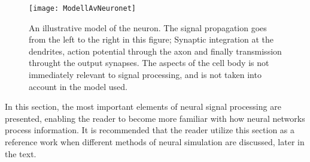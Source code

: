 \begin{figure}[hbt!p]
	\centering
	\texttt{[image: ModellAvNeuronet]}
	\caption{An illustrative model of the neuron. The signal propagation goes from the left to the right in this figure;
			Synaptic integration at the dendrites, action potential through the axon and finally transmission throught the output synapses. 
			The aspects of the cell body is not immediately relevant to signal processing, and is not taken into account in the model used. }
	\label{figFigurAvNeuronet}
\end{figure}
	
	In this section, the most important elements of neural signal processing are presented, enabling the reader to become more familiar with how neural networks process information.
	It is recommended that the reader utilize this section as a reference work when different methods of neural simulation are discussed, later in the text. %




	



	





		
	
